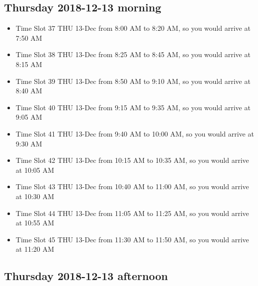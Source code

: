 \documentclass[]{book}
\providecommand{\tightlist}{%
  \setlength{\itemsep}{0pt}\setlength{\parskip}{0pt}}
\theoremstyle{definition}
\theoremstyle{definition}
\theoremstyle{definition}
\theoremstyle{remark}
\begin{document}
\hypertarget{thursday-2018-12-13-morning}{%
\subsection{Thursday 2018-12-13
morning}\label{thursday-2018-12-13-morning}}

\begin{itemize}
\tightlist
\item
  Time Slot 37 THU 13-Dec from 8:00 AM to 8:20 AM, so you would arrive
  at 7:50 AM
\item
  Time Slot 38 THU 13-Dec from 8:25 AM to 8:45 AM, so you would arrive
  at 8:15 AM
\item
  Time Slot 39 THU 13-Dec from 8:50 AM to 9:10 AM, so you would arrive
  at 8:40 AM
\item
  Time Slot 40 THU 13-Dec from 9:15 AM to 9:35 AM, so you would arrive
  at 9:05 AM
\item
  Time Slot 41 THU 13-Dec from 9:40 AM to 10:00 AM, so you would arrive
  at 9:30 AM
\item
  Time Slot 42 THU 13-Dec from 10:15 AM to 10:35 AM, so you would arrive
  at 10:05 AM
\item
  Time Slot 43 THU 13-Dec from 10:40 AM to 11:00 AM, so you would arrive
  at 10:30 AM
\item
  Time Slot 44 THU 13-Dec from 11:05 AM to 11:25 AM, so you would arrive
  at 10:55 AM
\item
  Time Slot 45 THU 13-Dec from 11:30 AM to 11:50 AM, so you would arrive
  at 11:20 AM
\end{itemize}

\hypertarget{thursday-2018-12-13-afternoon}{%
\subsection{Thursday 2018-12-13
afternoon}\label{thursday-2018-12-13-afternoon}}
\end{document}
